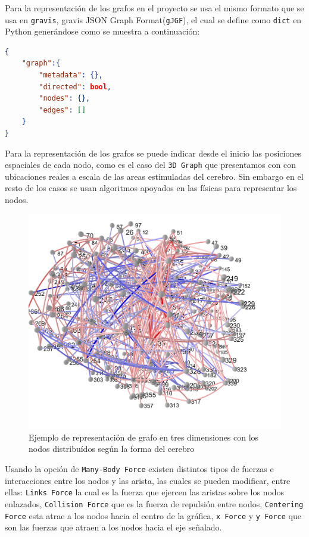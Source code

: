 \documentclass[a4paper,10pt,twocolumn]{article}
\begin{document}
Para la representación de los grafos en el proyecto se usa el mismo formato que se usa en \texttt{gravis}, gravis JSON Graph Format(\texttt{gJGF}),
el cual se define como \texttt{dict} en Python generándose como se muestra a continuación:

\begin{lstlisting}[language=json,firstnumber=1]
{
	"graph":{
		"metadata": {},
		"directed": bool,
		"nodes": {},
		"edges": []
	}	
}
\end{lstlisting}


Para la representación de los grafos se puede indicar desde el inicio las posiciones espaciales de cada nodo,
como es el caso del \texttt{3D Graph} que presentamos con con ubicaciones reales a escala de las areas estimuladas del cerebro.
Sin embargo en el resto de los casos se usan algoritmos apoyados en las físicas para representar los nodos.\\

\begin{figure}[h!]%
\includegraphics[scale=0.1]{3d_graph.jpg}
\caption{Ejemplo de representación de grafo en tres dimensiones con los nodos distribuídos según la forma del cerebro}
\end{figure}

Usando la opción de \texttt{Many-Body Force} existen distintos tipos de fuerzas e interacciones entre los nodos y las arista,
las cuales se pueden modificar, entre ellas: \texttt{Links Force} la cual es la fuerza que ejercen las aristas sobre los nodos
enlazados, \texttt{Collision Force} que es la fuerza de repulsión entre nodos, \texttt{Centering Force} esta atrae a los nodos hacia el centro de la gráfica, \texttt{x Force} y \texttt{y Force} que son las fuerzas que atraen a los nodos hacia el eje señalado.\\
\end{document}
